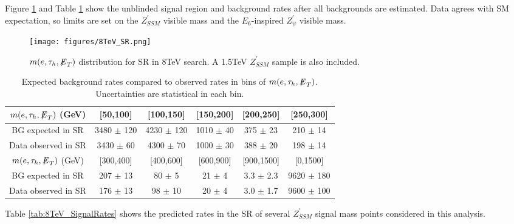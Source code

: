 Figure \ref{fig:8TeV_SR} and Table \ref{tab:8TeV_BGRates} show the unblinded signal region and background rates after all backgrounds are estimated. Data agrees with SM expectation, so limits are set on the $Z^{\prime}_{SSM}$ visible mass and the $E_6$-inspired $Z^{\prime}_{\psi}$ visible mass.

\begin{figure}[tbh!]
\centering
\texttt{[image: figures/8TeV\_SR.png]}
\caption{$m(e,\tau_{h},{\not\mathrel{E}}_T)$ distribution for SR in 8TeV search. A 1.5TeV $Z^{\prime}_{SSM}$ sample is also included.}
\label{fig:8TeV_SR}
\end{figure}

\begin{table}[ht]
\begin{center}
  \caption{Expected background rates compared to observed rates in bins of $m(e,\tau_{h},{\not\mathrel{E}}_T)$. Uncertainties are statistical in each bin.}\label{tab:8TeV_BGRates}
  \begin{tabular}{| c | c | c | c | c | c |}
  \hline
       $m(e,\tau_{h},{\not\mathrel{E}}_T)$ (GeV)      & [50,100]    & [100,150]     & [150,200]      & [200,250]     & [250,300]       \\ \hline
   BG expected in SR  & 3480 $\pm$ 120  & 4230 $\pm$ 120  & 1010 $\pm$ 40  & 375 $\pm$ 23 & 210 $\pm$ 14 \\
   Data observed in SR & 3430 $\pm$ 60  & 4300 $\pm$ 70   & 1000 $\pm$ 30  & 388 $\pm$ 20 & 198 $\pm$ 14  \\   \hline
       $m(e,\tau_{h},{\not\mathrel{E}}_T)$ (GeV) & [300,400]  & [400,600]   & [600,900]  & [900,1500] & [0,1500]      \\ \hline  
       BG expected in SR    & 207 $\pm$ 13   & 80 $\pm$ 5  & 21 $\pm$ 4  & 3.3 $\pm$ 2.3 & 9620 $\pm$ 180        \\   
       Data observed in SR  & 176 $\pm$ 13  & 98 $\pm$ 10  & 20 $\pm$ 4  & 3.0 $\pm$ 1.7 & 9600 $\pm$ 100      \\   

  \hline
  \end{tabular}
\end{center}
\end{table}

Table \ref{tab:8TeV_SignalRates} shows the predicted rates in the SR of several $Z^{\prime}_{SSM}$ signal mass points considered in this analysis.


